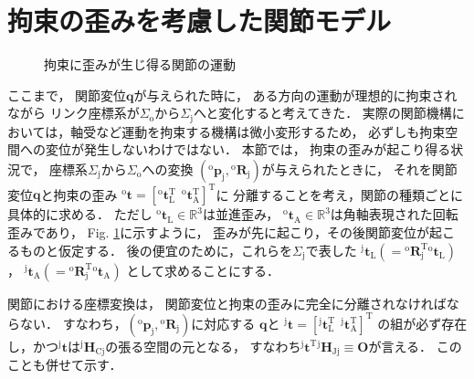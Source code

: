 ﻿\documentclass[a4paper]{jsarticle}
\begin{document}
\section{拘束の歪みを考慮した関節モデル}

\begin{figure}[htb]
\begin{center}

\caption{拘束に歪みが生じ得る関節の運動}
\label{fig:joint_torsion}
\end{center}
\end{figure}

ここまで，
関節変位$\bm{q}$が与えられた時に，
ある方向の運動が理想的に拘束されながら
リンク座標系が$\Sigma_{\mathrm{o}}$から$\Sigma_{\mathrm{j}}$へと変化すると考えてきた．
実際の関節機構においては，軸受など運動を拘束する機構は微小変形するため，
必ずしも拘束空間への変位が発生しないわけではない．
本節では，
拘束の歪みが起こり得る状況で，
座標系$\Sigma_{\mathrm{j}}$から$\Sigma_{\mathrm{o}}$への変換
$({}^{\mathrm{o}}\bm{p}_{\mathrm{j}}, {}^{\mathrm{o}}\bm{R}_{\mathrm{j}})$が与えられたときに，
それを関節変位$\bm{q}$と拘束の歪み
${}^{\mathrm{o}}\bm{t}=[{}^{\mathrm{o}}\bm{t}_{\mathrm{L}}^{\mathrm{T}}~~{}^{\mathrm{o}}\bm{t}_{\mathrm{A}}^{\mathrm{T}}]^{\mathrm{T}}$に
分離することを考え，関節の種類ごとに具体的に求める．
ただし
${}^{\mathrm{o}}\bm{t}_{\mathrm{L}}\in\mathbb{R}^{3}$は並進歪み，
${}^{\mathrm{o}}\bm{t}_{\mathrm{A}}\in\mathbb{R}^{3}$は角軸表現された回転歪みであり，
Fig. \ref{fig:joint_torsion}に示すように，
歪みが先に起こり，その後関節変位が起こるものと仮定する．
後の便宜のために，これらを$\Sigma_{\mathrm{j}}$で表した
${}^{\mathrm{j}}\bm{t}_{\mathrm{L}}(={}^{\mathrm{o}}\bm{R}_{\mathrm{j}}^{\mathrm{T}}{}^{\mathrm{o}}\bm{t}_{\mathrm{L}})$，
${}^{\mathrm{j}}\bm{t}_{\mathrm{A}}(={}^{\mathrm{o}}\bm{R}_{\mathrm{j}}^{\mathrm{T}}{}^{\mathrm{o}}\bm{t}_{\mathrm{A}})$
として求めることにする．

関節における座標変換は，
関節変位と拘束の歪みに完全に分離されなければならない．
すなわち，$({}^{\mathrm{o}}\bm{p}_{\mathrm{j}}, {}^{\mathrm{o}}\bm{R}_{\mathrm{j}})$に対応する
$\bm{q}$と
${}^{\mathrm{j}}\bm{t}=[{}^{\mathrm{j}}\bm{t}_{\mathrm{L}}^{\mathrm{T}}~~{}^{\mathrm{j}}\bm{t}_{\mathrm{A}}^{\mathrm{T}}]^{\mathrm{T}}$
の組が必ず存在し，かつ${}^{\mathrm{j}}\bm{t}$は${}^{\mathrm{j}}\bm{H}_{\mathrm{Cj}}$の張る空間の元となる，
すなわち${}^{\mathrm{j}}\bm{t}^{\mathrm{T}}{}^{\mathrm{j}}\bm{H}_{\mathrm{Jj}}\equiv\bm{O}$が言える．
このことも併せて示す．
\end{document}
